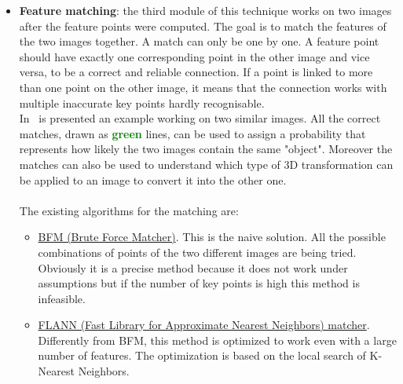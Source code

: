 \begin{itemize}
	\item \textbf{Feature matching}: the third module of this technique works on two images after the feature points were computed. The goal is to match the features of the two images together. A match can only be one by one. A feature point should have exactly one corresponding point in the other image and vice versa, to be a correct and reliable connection. If a point is linked to more than one point on the other image, it means that the connection works with multiple inaccurate key points hardly recognisable.\\
	In~ is presented an example working on two similar images. All the correct matches, drawn as \textbf{\textcolor{green}{green}} lines, can be used to assign a probability that represents how likely the two images contain the same "object". Moreover the matches can also be used to understand which type of 3D transformation can be applied to an image to convert it into the other one.\\
	\\
	The existing algorithms for the matching are:
	\begin{itemize}
		\item \underline{BFM (Brute Force Matcher)}. This is the naive solution. All the possible combinations of points of the two different images are being tried. Obviously it is a precise method because it does not work under assumptions but if the number of key points is high this method is infeasible.
		\item \underline{FLANN (Fast Library for Approximate Nearest Neighbors) matcher}\cite{flann}. Differently from BFM, this method is optimized to work even with a large number of features. The optimization is based on the local search of K-Nearest Neighbors.
	\end{itemize}
\end{itemize}
